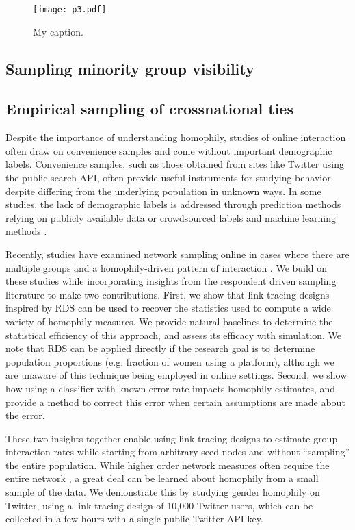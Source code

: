 \documentclass[a4paper]{article}
\begin{document}
\begin{figure}[h!]
	\texttt{[image: p3.pdf]}
	\centering
	\caption{My caption.}
\end{figure}

\subsection{Sampling minority group visibility}



\subsection{Empirical sampling of crossnational ties}

\newpage

Despite the importance of understanding homophily, studies of online interaction often draw on convenience samples and come without important demographic labels. Convenience samples, such as those obtained from sites like Twitter using the public search API, often provide useful instruments for studying behavior despite differing from the underlying population in unknown ways. In some studies, the lack of demographic labels is addressed through prediction methods relying on publicly available data \cite{} or crowdsourced labels and machine learning methods \cite{}.

Recently, studies have examined network sampling online in cases where there are multiple groups and a homophily-driven pattern of interaction \cite{wang_sampling_2015,karimi_visibility_2017,wagner_sampling_2017}. We build on these studies while incorporating insights from the respondent driven sampling literature \cite{heckathorn_respondent-driven_2002,salganik_sampling_2004,goel_respondent-driven_2009} to make two contributions. First, we show that link tracing designs inspired by RDS can be used to recover the statistics used to compute a wide variety of homophily measures. We provide natural baselines to determine the statistical efficiency of this approach, and assess its efficacy with simulation. We note that RDS can be applied directly if the research goal is to determine population proportions (e.g. fraction of women using a platform), although we are unaware of this technique being employed in online settings. Second, we show how using a classifier with known error rate impacts homophily estimates, and provide a method to correct this error when certain assumptions are made about the error.

These two insights together enable using link tracing designs to estimate group interaction rates while starting from arbitrary seed nodes and without ``sampling'' the entire population. While higher order network measures often require the entire network \cite{kossinets_effects_2006}, a great deal can be learned about homophily from a small sample of the data. We demonstrate this by studying gender homophily on Twitter, using a link tracing design of 10,000 Twitter users, which can be collected in a few hours with a single public Twitter API key.
\end{document}
